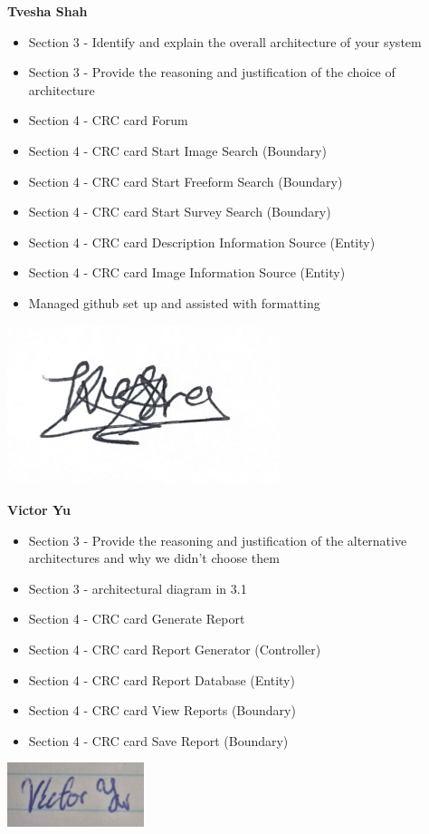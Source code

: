 \documentclass[]{article}
\begin{document}
\textbf{Tvesha Shah}
\begin{itemize}
    \setlength\itemindent{2em}
    \item Section 3 -  Identify and explain the overall architecture of your system  
    \item Section 3 - Provide the reasoning and justification of the choice of architecture 
    \item Section 4 - CRC card Forum 
    \item Section 4 - CRC card Start Image Search (Boundary)
    \item Section 4 - CRC card Start Freeform Search (Boundary)
    \item Section 4 - CRC card Start Survey Search (Boundary) 
    \item Section 4 - CRC card Description Information Source (Entity)
    \item Section 4 - CRC card Image Information Source (Entity)
    \item Managed github set up and assisted with formatting
\end{itemize} 
\includegraphics[width=0.6\textwidth]{Tvesha.png}

\textbf{Victor Yu}
\begin{itemize}
    \setlength\itemindent{2em}
    \item Section 3 -  Provide the reasoning and justification of the alternative architectures and why we didn't choose them 
    \item Section 3 -  architectural diagram in 3.1
    \item Section 4 - CRC card Generate Report
    \item Section 4 - CRC card Report Generator (Controller)
    \item Section 4 - CRC card Report Database (Entity)
    \item Section 4 - CRC card View Reports (Boundary)
    \item Section 4 - CRC card Save Report (Boundary)
\end{itemize}
\includegraphics[width=0.3\textwidth]{Victor.png}
\end{document}
